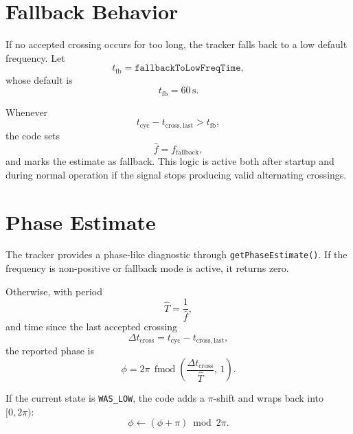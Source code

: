 \documentclass[conference]{IEEEtran}
\begin{document}
\section{Fallback Behavior}

If no accepted crossing occurs for too long, the tracker falls back to a low
default frequency. Let
\begin{equation}
  t_{\mathrm{fb}} = \texttt{fallbackToLowFreqTime},
\end{equation}
whose default is
\begin{equation}
  t_{\mathrm{fb}} = 60\,\text{s}.
\end{equation}

Whenever
\begin{equation}
  t_{\mathrm{cyc}} - t_{\mathrm{cross,last}} > t_{\mathrm{fb}},
\end{equation}
the code sets
\begin{equation}
  \hat f = f_{\mathrm{fallback}},
\end{equation}
and marks the estimate as fallback. This logic is active both after startup
and during normal operation if the signal stops producing valid alternating
crossings.

\section{Phase Estimate}

The tracker provides a phase-like diagnostic through
\texttt{getPhaseEstimate()}. If the frequency is non-positive or fallback mode
is active, it returns zero.

Otherwise, with period
\begin{equation}
  \hat T = \frac{1}{\hat f},
\end{equation}
and time since the last accepted crossing
\begin{equation}
  \Delta t_{\mathrm{cross}}
  =
  t_{\mathrm{cyc}} - t_{\mathrm{cross,last}},
\end{equation}
the reported phase is
\begin{equation}
  \phi
  =
  2\pi\,
  \operatorname{fmod}\!\left(
    \frac{\Delta t_{\mathrm{cross}}}{\hat T},\,1
  \right).
\end{equation}

If the current state is \texttt{WAS\_LOW}, the code adds a \(\pi\)-shift and
wraps back into \([0,2\pi)\):
\begin{equation}
  \phi \leftarrow (\phi+\pi)\bmod 2\pi.
\end{equation}
\end{document}
